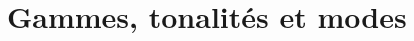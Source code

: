 \documentclass[11pt]{scrreprt}
\begin{document}
\chapter*{Gammes, tonalités et modes}
%
\end{document}
